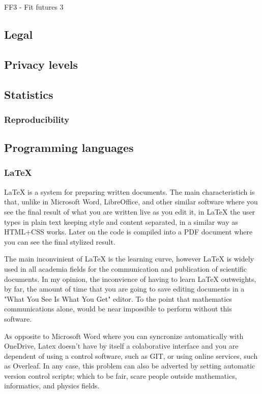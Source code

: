 FF3 - Fit futures 3



\subsection{Legal}
\subsection{Privacy levels}

\subsection{Statistics}

\subsubsection{Reproducibility}

\subsection{Programming languages}

\subsubsection{LaTeX}

LaTeX  \cite{ref:latexintro} is a system for preparing written documents. The main characteristich is that, unlike in Microsoft Word, LibreOffice, and other similar software where you see the final result of what you are written live as you edit it, in LaTeX the user types in plain text keeping style and content separated, in a similar way as HTML+CSS works. Later on the code is compiled into a PDF document where you can see the final stylized result.\vspace{3 mm}

The main inconvinient of LaTeX is the learning curve, however LaTeX is widely used in all academia fields for the communication and publication of scientific documents. In my opinion, the inconvience of having to learn LaTeX outweights, by far, the amount of time that you are going to save editing documents in a "What You See Is What You Get"  \cite{ref:wysiwyg} editor. To the point that mathematics communications alone, would be near impossible to perform without this software.\vspace{3 mm}

As opposite to Microsoft Word where you can syncronize automatically with OneDrive, Latex doesn't have by itself a colaborative interface and you are dependent of using a control software, such as GIT, or using online services, such as Overleaf. In any case, this problem can also be adverted by setting automatic version control scripts; which to be fair, scare people outside mathematics, informatics, and physics fields.\vspace{3 mm}

